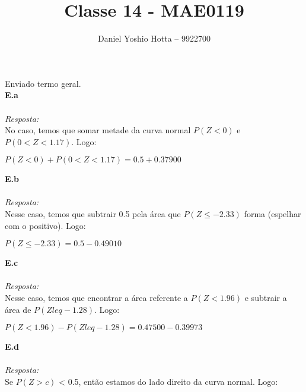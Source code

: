 \documentclass{article}
\begin{document}
	
	\title{Classe 14 - MAE0119}
	\author{Daniel Yoshio Hotta – 9922700}
	
	\maketitle	
	
	Enviado termo geral.\\
	
	\textbf {E.a} 
	\\ \\
	\textit {Resposta:} \\
    
    No caso, temos que somar metade da curva normal $P (Z < 0)$ e $P(0 < Z < 1.17)$. Logo:\\
    
    \begin{center}
    	$P (Z < 0) + P(0 < Z < 1.17) = 0.5 + 0.37900$
    \end{center}
    
    \textbf {E.b} 
    \\ \\
    \textit {Resposta:} \\	
        
    Nesse caso, temos que subtrair 0.5 pela área que $P(Z \leq -2.33)$ forma (espelhar com o positivo). Logo:\\
    
    \begin{center}
    	$P(Z \leq -2.33) = 0.5 - 0.49010$
    \end{center}

    \textbf {E.c} 
    \\ \\
    \textit {Resposta:} \\
    
    Nesse caso, temos que encontrar a área referente a $P(Z < 1.96)$ e subtrair a área de $P(Z leq -1.28)$. Logo:\\
    
    \begin{center}
    	$P(Z < 1.96) - P(Z leq -1.28) = 0.47500 - 0.39973$
    \end{center}
    
    \textbf {E.d} 
    \\ \\
    \textit {Resposta:} \\
    
    Se $P(Z > c)$ < 0.5, então estamos do lado direito da curva normal.  Logo:\\
    
\end{document}
